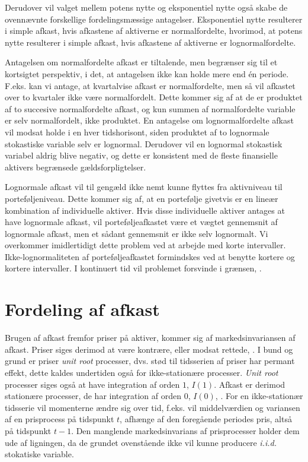 \documentclass[
  a4paper,
  oneside]{memoir}
\begin{document}
Derudover vil valget mellem potens nytte og eksponentiel nytte også skabe de ovennævnte forskellige fordelingsmæssige antagelser. Eksponentiel nytte resulterer i simple afkast, hvis afkastene af aktiverne er normalfordelte, hvorimod, at potens nytte resulterer i simple afkast, hvis afkastene af aktiverne er lognormalfordelte.

Antagelsen om normalfordelte afkast er tiltalende, men begrænser sig til et kortsigtet perspektiv, i det, at antagelsen ikke kan holde mere end én periode. F.eks. kan vi antage, at kvartalvise afkast er normalfordelte, men så vil afkastet over to kvartaler ikke være normalfordelt. Dette kommer sig af at de er produktet af to succesive normalfordelte afkast, og kun summen af normalfordelte variable er selv normalfordelt, ikke produktet. En antagelse om lognormalfordelte afkast vil modsat holde i en hver tidshorisont, siden produktet af to lognormale stokastiske variable selv er lognormal. Derudover vil en lognormal stokastisk variabel aldrig blive negativ, og dette er konsistent med de fleste finansielle aktivers begrænsede gældsforpligtelser.

Lognormale afkast vil til gengæld ikke nemt kunne flyttes fra aktivniveau til porteføljeniveau. Dette kommer sig af, at en portefølje givetvis er en lineær kombination af individuelle aktiver. Hvis disse individuelle aktiver antages at have lognormale afkast, vil porteføljeafkastet være et vægtet gennemsnit af lognormale afkast, men et sådant gennemsnit er ikke selv lognormalt. Vi overkommer imidlertidigt dette problem ved at arbejde med korte intervaller. Ikke-lognormaliteten af porteføljeafkastet formindskes ved at benytte kortere og kortere intervaller. I kontinuert tid vil problemet forsvinde i grænsen, \citep{CampVic2003}.

\hypertarget{fordeling-af-afkast}{%
\section{Fordeling af afkast}\label{fordeling-af-afkast}}

Brugen af afkast fremfor priser på aktiver, kommer sig af markedsinvariansen af afkast. Priser siges derimod at være kontrære, eller modsat rettede, \citep{Jondeau2007}. I bund og grund er priser \emph{unit root} processer, dvs. stød til tidsserien af priser har permant effekt, dette kaldes undertiden også for ikke-stationære processer. \emph{Unit root} processer siges også at have integration af orden \(1\), \(I(1)\). Afkast er derimod stationære processer, de har integration af orden \(0\), \(I(0)\), \citep{Verbeek2017}. For en ikke-stationær tidsserie vil momenterne ændre sig over tid, f.eks. vil middelværdien og variansen af en prisprocess på tidspunkt \(t\), afhænge af den foregående periodes pris, altså på tidspunkt \(t-1\). Den manglende markedsinvarians af prisprocesser holder dem ude af ligningen, da de grundet ovenstående ikke vil kunne producere \emph{i.i.d.} stokatiske variable.
\end{document}
